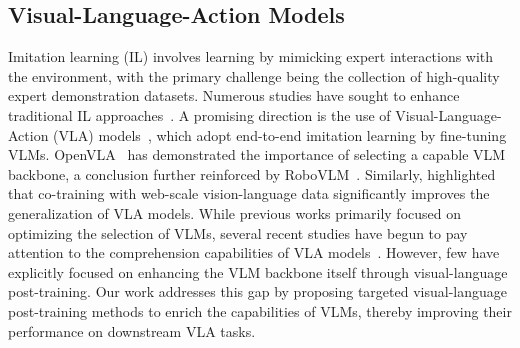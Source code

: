 \subsection{Visual-Language-Action Models}
Imitation learning (IL) involves learning by mimicking expert interactions with the environment, with the primary challenge being the collection of high-quality expert demonstration datasets. Numerous studies have sought to enhance traditional IL approaches~\citep{diffusion_policy,octo,rt-1}. A promising direction is the use of Visual-Language-Action (VLA) models~\citep{rt-2,openVLA,tracevla,hiRT,dexgraspvla}, which adopt end-to-end imitation learning by fine-tuning VLMs. OpenVLA~\citep{openVLA} has demonstrated the importance of selecting a capable VLM backbone, a conclusion further reinforced by RoboVLM~\citep{roboVLA}. Similarly, \citet{rt-2} highlighted that co-training with web-scale vision-language data significantly improves the generalization of VLA models. While previous works primarily focused on optimizing the selection of VLMs, several recent studies have begun to pay attention to the comprehension capabilities of VLA models~\citep{upvla,objectvla,chatvla,combat_vla}. However, few have explicitly focused on enhancing the VLM backbone itself through visual-language post-training. Our work addresses this gap by proposing targeted visual-language post-training methods to enrich the capabilities of VLMs, thereby improving their performance on downstream VLA tasks.

